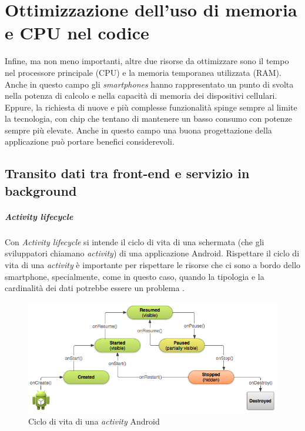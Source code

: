 \documentclass[a4paper,10pt]{memoir}
\begin{document}
\chapter{Ottimizzazione dell'uso di memoria e CPU nel codice}

Infine, ma non meno importanti, altre due risorse da ottimizzare sono il tempo nel processore principale (CPU) e la memoria temporanea utilizzata (RAM). Anche in questo campo gli \textit{smartphones} hanno rappresentato un punto di svolta nella potenza di calcolo e nella capacità di memoria dei dispositivi cellulari. Eppure, la richiesta di nuove e più complesse funzionalità spinge sempre al limite la tecnologia, con chip che tentano di mantenere un basso consumo con potenze sempre più elevate. Anche in questo campo una buona progettazione della applicazione può portare benefici considerevoli.

\section{Transito dati tra front-end e servizio in background}

\paragraph{Activity lifecycle} Con \textit{Activity lifecycle} si intende il ciclo di vita di una schermata (che gli sviluppatori chiamano \textit{activity}) di una applicazione Android. Rispettare il ciclo di vita di una \textit{activity} è importante per rispettare le risorse che ci sono a bordo dello smartphone, specialmente, come in questo caso, quando la tipologia e la cardinalità dei dati potrebbe essere un problema \cite{activitylifecycle}.

\begin{figure}[h]
\centering
\caption{Ciclo di vita di una \textit{activity} Android}
\label{fig:activitylifecycle}
\includegraphics[width=\textwidth]{app/android_activity_lifecycle}
\end{figure}
\end{document}
